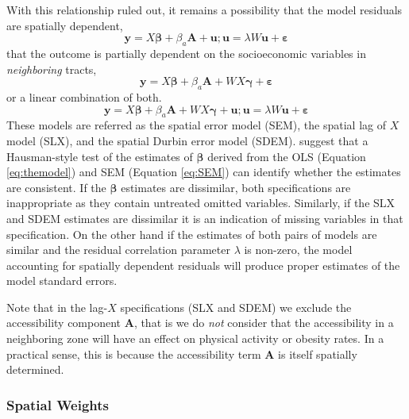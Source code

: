 \documentclass[shortAfour,sageh.bst]{sagej}
\begin{document}
With this relationship ruled out, it remains a possibility that the
model residuals are spatially dependent, \begin{equation}\label{eq:SEM}
 \boldsymbol{y} = X\boldsymbol{\beta} + \beta_a \boldsymbol{A} + \boldsymbol{u}; \boldsymbol{u} = \lambda W \boldsymbol{u} + \boldsymbol{\varepsilon}
\end{equation} that the outcome is partially dependent on the
socioeconomic variables in \emph{neighboring} tracts,
\begin{equation}\label{eq:SLX}
 \boldsymbol{y} = X\boldsymbol{\beta} + \beta_a \boldsymbol{A} + W X \boldsymbol{\gamma} + \boldsymbol{\varepsilon}
\end{equation} or a linear combination of both.
\begin{equation}\label{eq:SDEM}
 \boldsymbol{y} = X\boldsymbol{\beta} + \beta_a \boldsymbol{A} + W X \boldsymbol{\gamma} + \boldsymbol{u}; \boldsymbol{u} = \lambda W \boldsymbol{u} + \boldsymbol{\varepsilon}
\end{equation} These models are referred as the spatial error model
(SEM), the spatial lag of \(X\) model (SLX), and the spatial Durbin
error model (SDEM). \citet{Pace2008} suggest that a Hausman-style test
of the estimates of \(\boldsymbol{\beta}\) derived from the OLS
(Equation \ref{eq:themodel}) and SEM (Equation \ref{eq:SEM}) can
identify whether the estimates are consistent. If the
\(\boldsymbol{\beta}\) estimates are dissimilar, both specifications are
inappropriate as they contain untreated omitted variables. Similarly, if
the SLX and SDEM estimates are dissimilar it is an indication of missing
variables in that specification. On the other hand if the estimates of
both pairs of models are similar and the residual correlation parameter
\(\lambda\) is non-zero, the model accounting for spatially dependent
residuals will produce proper estimates of the model standard errors.

Note that in the lag-\(X\) specifications (SLX and SDEM) we exclude the
accessibility component \(\boldsymbol{A}\), that is we do \emph{not}
consider that the accessibility in a neighboring zone will have an
effect on physical activity or obesity rates. In a practical sense, this
is because the accessibility term \(\boldsymbol{A}\) is itself spatially
determined.

\hypertarget{spatial-weights}{%
\subsubsection{Spatial Weights}\label{spatial-weights}}
\end{document}
